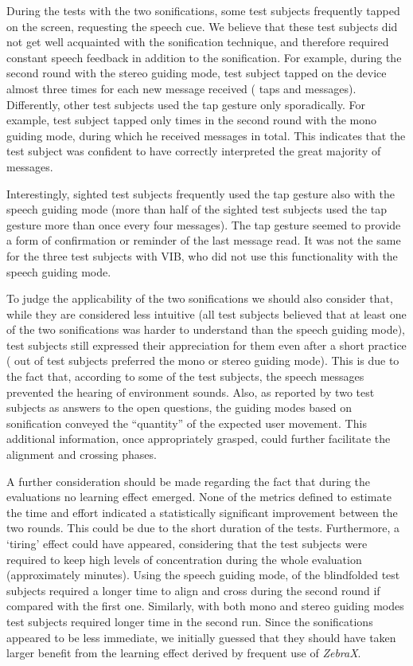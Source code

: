 \documentclass{article}
\newcommand{\zebra}{\emph{ZebraX}}
\begin{document}
During the tests with the two sonifications, some test subjects frequently tapped on the screen, requesting the speech cue.
We believe that these test subjects did not get well acquainted with the sonification technique, and therefore required constant speech feedback in addition to the sonification.
For example, during the second round with the stereo guiding mode, test subject  tapped on the device almost three times for each new message received ( taps and  messages).
Differently, other test subjects used the tap gesture only sporadically. For example, test subject  tapped only  times in the second round with the mono guiding mode, during which he received  messages in total. This indicates that the test subject was confident to have correctly interpreted the great majority of messages.

Interestingly, sighted test subjects frequently used the tap gesture also with the speech guiding mode (more than half of the sighted test subjects used the tap gesture more than once every four messages).
The tap gesture seemed to provide a form of confirmation or reminder of the last message read. It was not the same for the three test subjects with VIB, who did not use this functionality with the speech guiding mode.

To judge the applicability of the two sonifications we should also consider that, while they are considered less intuitive (all test subjects believed that at least one of the two sonifications was harder to understand than the speech guiding mode), test subjects still expressed their appreciation for them even after a short practice ( out of  test subjects preferred the mono or stereo guiding mode).
This is due to the fact that, according to some of the test subjects, the speech messages prevented the hearing of environment sounds. Also, as reported by two test subjects as answers to the open questions, the guiding modes based on sonification conveyed the ``quantity'' of the expected user movement. This additional information, once appropriately grasped, could further facilitate the alignment and crossing phases.

A further consideration should be made regarding the fact that during the evaluations no learning effect emerged. None of the metrics defined to estimate the time and effort indicated a statistically significant improvement between the two rounds. This could be due to the short duration of the tests. Furthermore, a `tiring' effect could have appeared, considering that the test subjects were required to keep high levels of concentration during the whole evaluation (approximately  minutes). Using the speech guiding mode,  of the  blindfolded test subjects required a longer time to align and cross during the second round if compared with the first one.
Similarly, with both mono and stereo guiding modes  test subjects required longer time in the second run. Since the sonifications appeared to be less immediate, we initially guessed that they should have taken larger benefit from the learning effect derived by frequent use of \zebra{}.
\end{document}
